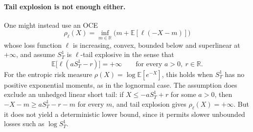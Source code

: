 \documentclass[11pt,a4paper]{report}
\numberwithin{equation}{chapter}
\theoremstyle{plain}
\theoremstyle{definition}
\newcommand{\E}{\mathbb{E}}
\newcommand{\R}{\mathbb{R}}
\begin{document}
\paragraph{Tail explosion is not enough either.}
One might instead use an OCE
\[
    \rho_\ell(X)=\inf_{m\in\R}\bigl(m+\E[\ell(-X-m)]\bigr)
\]
whose loss function $\ell$ is increasing, convex, bounded below and superlinear at $+\infty$, and assume $S_T^1$ is $\ell$-tail explosive in the sense that
\[
    \E\bigl[\ell(aS_T^1-r)\bigr]=+\infty\qquad\text{for every }a>0,\ r\in\R.
\]
For the entropic risk measure $\rho(X)=\log\E[e^{-X}]$, this holds when $S_T^1$ has no positive exponential moments, as in the lognormal case. The assumption does exclude an unhedged linear short tail: if $X\le-aS_T^1+r$ for some $a>0$, then $-X-m\ge aS_T^1-r-m$ for every $m$, and tail explosion gives $\rho_\ell(X)=+\infty$. But it does not yield a deterministic lower bound, since it permits slower unbounded losses such as $\log S_T^1$.
\end{document}
